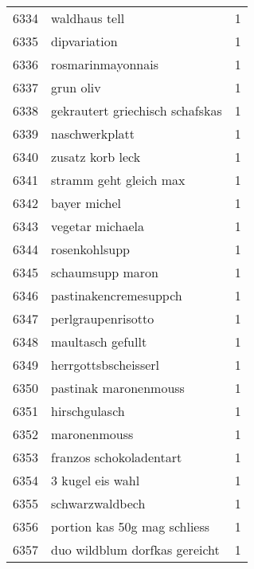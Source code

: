 \begin{tabular}{llr}
6334 &                                      waldhaus tell &      1 \\
6335 &                                       dipvariation &      1 \\
6336 &                                  rosmarinmayonnais &      1 \\
6337 &                                          grun oliv &      1 \\
6338 &                    gekrautert griechisch schafskas &      1 \\
6339 &                                     naschwerkplatt &      1 \\
6340 &                                   zusatz korb leck &      1 \\
6341 &                             stramm geht gleich max &      1 \\
6342 &                                       bayer michel &      1 \\
6343 &                                   vegetar michaela &      1 \\
6344 &                                      rosenkohlsupp &      1 \\
6345 &                                   schaumsupp maron &      1 \\
6346 &                              pastinakencremesuppch &      1 \\
6347 &                                 perlgraupenrisotto &      1 \\
6348 &                                  maultasch gefullt &      1 \\
6349 &                               herrgottsbscheisserl &      1 \\
6350 &                              pastinak maronenmouss &      1 \\
6351 &                                      hirschgulasch &      1 \\
6352 &                                       maronenmouss &      1 \\
6353 &                            franzos schokoladentart &      1 \\
6354 &                                   3 kugel eis wahl &      1 \\
6355 &                                    schwarzwaldbech &      1 \\
6356 &                       portion kas 50g mag schliess &      1 \\
6357 &                      duo wildblum dorfkas gereicht &      1 \\

\end{tabular}
